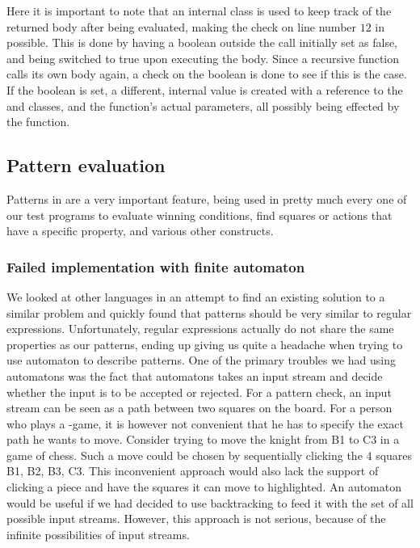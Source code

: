 

Here it is important to note that an internal class is used to keep track of the returned body after being evaluated, making the check on line number $12$ in  possible. This is done by having a boolean outside the call initially set as false, and being switched to true upon executing the body. Since a recursive function calls its own body again, a check on the boolean is done to see if this is the case. If the boolean is set, a different, internal value  is created with a reference to the  and  classes, and the function's actual parameters, all possibly being effected by the function.

\subsection{Pattern evaluation}
Patterns in \productname{} are a very important feature, being used
in pretty much every one of our test programs to evaluate winning
conditions, find squares or actions that have a specific property, and
various other constructs.

\subsubsection{Failed implementation with finite automaton}
We looked at other languages in an attempt to find an existing solution
to a similar problem and quickly found that patterns should be very
similar to regular expressions. Unfortunately, regular expressions
actually do not share the same properties as our patterns, ending up
giving us quite a headache when trying to use automaton to describe
patterns. One of the primary troubles we had using automatons was the fact 
that automatons takes an input stream and decide whether the input is to be accepted 
or rejected. For a pattern check, an input stream can be seen as a path 
between two squares on the board. For a person who plays a \productname{}-game, it is however 
not convenient that he has to specify the exact path he wants to move. Consider trying to move the 
knight from B1 to C3 in a game of chess. Such a move could be chosen by 
sequentially clicking the 4 squares  B1, B2, B3, C3. This inconvenient approach 
would also lack the support of clicking a piece and have the squares it can 
move to highlighted. An automaton would be useful if we had decided to use backtracking 
to feed it with the set of all possible input streams. However, this approach is 
not serious, because of the infinite possibilities of input streams. 

